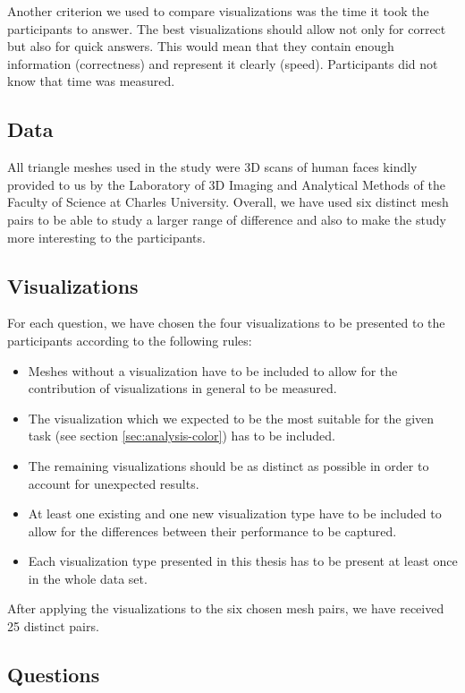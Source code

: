 Another criterion we used to compare visualizations was the time it took the participants to answer. The best visualizations should allow not only for correct but also for quick answers. This would mean that they contain enough information (correctness) and represent it clearly (speed). Participants did not know that time was measured.

\subsection{Data}

All triangle meshes used in the study were 3D scans of human faces kindly provided to us by the Laboratory of 3D Imaging and Analytical Methods of the Faculty of Science at Charles University. Overall, we have used six distinct mesh pairs to be able to study a larger range of difference and also to make the study more interesting to the participants.

\subsection{Visualizations}

For each question, we have chosen the four visualizations to be presented to the participants according to the following rules:

\begin{itemize}
\item Meshes without a visualization have to be included to allow for the contribution of visualizations in general to be measured.
\item The visualization which we expected to be the most suitable for the given task (see section \ref{sec:analysis-color}) has to be included.
\item The remaining visualizations should be as distinct as possible in order to account for unexpected results.
\item At least one existing and one new visualization type have to be included to allow for the differences between their performance to be captured.
\item Each visualization type presented in this thesis has to be present at least once in the whole data set.
\end{itemize}

After applying the visualizations to the six chosen mesh pairs, we have received 25 distinct pairs.

\subsection{Questions}


